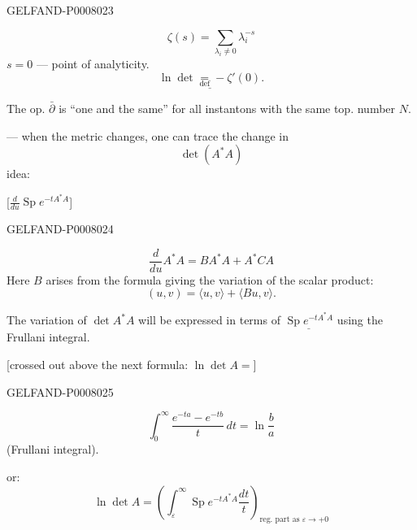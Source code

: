 \begin{GelfandAdjacentEvidence}{GELFAND-P000802}{3}

\begin{equation*}
\zeta(s)=\sum_{\lambda_i\ne0}\lambda_i^{-s}
\tag{16}
\end{equation*}
\(s=0\) --- point of analyticity.
\begin{equation*}
\underline{\ln\det\underset{\mathrm{def}}{=}-\zeta'(0)}.
\tag{17}
\end{equation*}

The op. \(\bar\partial\) is “one and the same” for all instantons with the same top. number \(N\).

 --- when the metric changes, one can trace the change in
\[
\det(A^*A)
\]
idea:

[\sout{\(\frac{d}{du}\operatorname{Sp}e^{-tA^*A}\)}]
\end{GelfandAdjacentEvidence}
\begin{GelfandAdjacentEvidence}{GELFAND-P000802}{4}

\begin{equation*}
\frac{d}{du}A^*A=BA^*A+A^*CA
\tag{18}
\end{equation*}
Here \(B\) arises from the formula giving the variation of the scalar product:
\begin{equation*}
(u,v)=\langle u,v\rangle+\langle Bu,v\rangle.
\tag{19}
\end{equation*}

The variation of \(\det A^*A\) will be expressed in terms of
\(\underline{\operatorname{Sp}e^{-tA^*A}}\) using the Frullani integral.

[crossed out above the next formula: \sout{\(\ln\det A=\)}]
\end{GelfandAdjacentEvidence}
\begin{GelfandAdjacentEvidence}{GELFAND-P000802}{5}

\begin{equation*}
\int_0^\infty\frac{e^{-ta}-e^{-tb}}{t}\,dt=\ln\frac ba
\tag{20}
\end{equation*}
(Frullani integral).

or:
\begin{equation*}
\ln\det A=
\left(\int_\varepsilon^\infty\operatorname{Sp}e^{-tA^*A}\frac{dt}{t}\right)_{\text{reg. part as }\varepsilon\to+0}
\tag{21}
\end{equation*}
\end{GelfandAdjacentEvidence}



